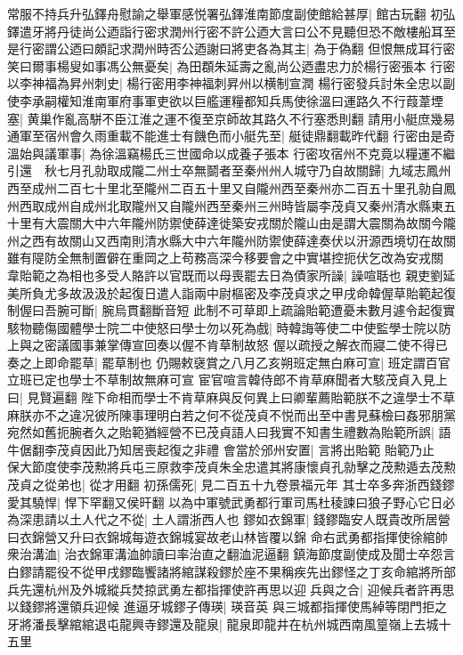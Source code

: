 常服不持兵升弘鐸舟慰諭之舉軍感悦署弘鐸淮南節度副使館給甚厚|{
	館古玩翻}
初弘鐸遣牙將丹徒尚公迺詣行密求潤州行密不許公迺大言曰公不見聽但恐不敵樓船耳至是行密謂公迺曰頗記求潤州時否公迺謝曰將吏各為其主|{
	為于偽翻}
但恨無成耳行密笑曰爾事楊叟如事馮公無憂矣|{
	為田頵朱延壽之亂尚公迺盡忠力於楊行密張本}
行密以李神福為昇州刺史|{
	楊行密用李神福刺昇州以横制宣潤}
楊行密發兵討朱全忠以副使李承嗣權知淮南軍府事軍吏欲以巨艦運糧都知兵馬使徐溫曰運路久不行葭葦堙塞|{
	黄巢作亂高駢不臣江淮之運不復至京師故其路久不行塞悉則翻}
請用小艇庶幾易通軍至宿州會久雨重載不能進士有饑色而小艇先至|{
	艇徒鼎翻載昨代翻}
行密由是奇溫始與議軍事|{
	為徐溫竊楊氏三世國命以成養子張本}
行密攻宿州不克竟以糧運不繼引還　秋七月孔勍取成隴二州士卒無鬬者至秦州州人城守乃自故關歸|{
	九域志鳳州西至成州二百七十里北至隴州二百五十里又自隴州西至秦州亦二百五十里孔勍自鳳州西取成州自成州北取隴州又自隴州西至秦州三州時皆屬李茂貞又秦州清水縣東五十里有大震關大中六年隴州防禦使薛達徙築安戎關於隴山由是謂大震關為故關今隴州之西有故關山又西南則清水縣大中六年隴州防禦使薛達奏伏以汧源西境切在故關雖有隄防全無制置僻在重岡之上苟務高深今移要會之中實堪控扼伏乞改為安戎關}
韋貽範之為相也多受人賂許以官既而以母喪罷去日為債家所譟|{
	譟喧聒也}
親吏劉延美所負尤多故汲汲於起復日遣人詣兩中尉樞密及李茂貞求之甲戌命韓偓草貽範起復制偓曰吾腕可斷|{
	腕烏貫翻斷音短}
此制不可草即上疏論貽範遭憂未數月遽令起復實駭物聽傷國體學士院二中使怒曰學士勿以死為戲|{
	時韓誨等使二中使監學士院以防上與之密議國事兼掌傳宣回奏以偓不肯草制故怒}
偓以疏授之解衣而寢二使不得已奏之上即命罷草|{
	罷草制也}
仍賜敕襃賞之八月乙亥朔班定無白麻可宣|{
	班定謂百官立班已定也學士不草制故無麻可宣}
宦官喧言韓侍郎不肯草麻聞者大駭茂貞入見上曰|{
	見賢遍翻}
陛下命相而學士不肯草麻與反何異上曰卿輩薦貽範朕不之違學士不草麻朕亦不之違况彼所陳事理明白若之何不從茂貞不悦而出至中書見蘇檢曰姦邪朋黨宛然如舊扼腕者久之貽範猶經營不已茂貞語人曰我實不知書生禮數為貽範所誤|{
	語牛倨翻李茂貞因此乃知居喪起復之非禮}
會當於邠州安置|{
	言將出貽範}
貽範乃止　保大節度使李茂勲將兵屯三原救李茂貞朱全忠遣其將康懷貞孔勍擊之茂勲遁去茂勲茂貞之從弟也|{
	從才用翻}
初孫儒死|{
	見二百五十九卷景福元年}
其士卒多奔浙西錢鏐愛其驍悍|{
	悍下罕翻又侯旰翻}
以為中軍號武勇都行軍司馬杜稜諫曰狼子野心它日必為深患請以土人代之不從|{
	土人謂浙西人也}
鏐如衣錦軍|{
	錢鏐臨安人既貴改所居營曰衣錦營又升曰衣錦城每遊衣錦城宴故老山林皆覆以錦}
命右武勇都指揮使徐綰帥衆治溝洫|{
	治衣錦軍溝洫帥讀曰率治直之翻洫泥逼翻}
鎮海節度副使成及聞士卒怨言白鏐請罷役不從甲戌鏐臨饗諸將綰謀殺鏐於座不果稱疾先出鏐怪之丁亥命綰將所部兵先還杭州及外城縱兵焚掠武勇左都指揮使許再思以迎兵與之合|{
	迎候兵者許再思以錢鏐將還領兵迎候}
進逼牙城鏐子傳瑛|{
	瑛音英}
與三城都指揮使馬綽等閉門拒之牙將潘長擊綰綰退屯龍興寺鏐還及龍泉|{
	龍泉即龍井在杭州城西南風篁嶺上去城十五里}
